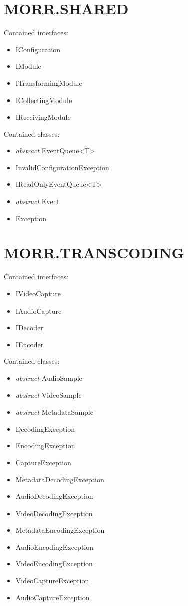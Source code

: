 \section{MORR.SHARED}

Contained interfaces:
\begin{itemize}
\item IConfiguration
\item IModule
\item ITransformingModule
\item ICollectingModule
\item IReceivingModule
\end{itemize}

Contained classes:
\begin{itemize}
\item \textit{abstract} EventQueue<T>
\item InvalidConfigurationException
\item IReadOnlyEventQueue<T>
\item \textit{abstract} Event
\item Exception
\end{itemize}

\section{MORR.TRANSCODING}

Contained interfaces:
\begin{itemize}
\item IVideoCapture
\item IAudioCapture
\item IDecoder
\item IEncoder
\end{itemize}

Contained classes:
\begin{itemize}
\item \textit{abstract} AudioSample
\item \textit{abstract} VideoSample
\item \textit{abstract} MetadataSample
\item DecodingException
\item EncodingException
\item CaptureException
\item MetadataDecodingException
\item AudioDecodingException
\item VideoDecodingException
\item MetadataEncodingException
\item AudioEncodingException
\item VideoEncodingException
\item VideoCaptureException
\item AudioCaptureException
\end{itemize}

